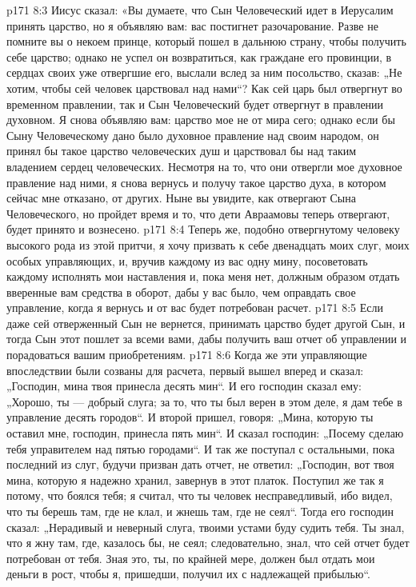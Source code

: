 \vs p171 8:3 \pc Иисус сказал: «Вы думаете, что Сын Человеческий идет в Иерусалим принять царство, но я объявляю вам: вас постигнет разочарование. Разве не помните вы о некоем принце, который пошел в дальнюю страну, чтобы получить себе царство; однако не успел он возвратиться, как граждане его провинции, в сердцах своих уже отвергшие его, выслали вслед за ним посольство, сказав: „Не хотим, чтобы сей человек царствовал над нами“? Как сей царь был отвергнут во временном правлении, так и Сын Человеческий будет отвергнут в правлении духовном. Я снова объявляю вам: царство мое не от мира сего; однако если бы Сыну Человеческому дано было духовное правление над своим народом, он принял бы такое царство человеческих душ и царствовал бы над таким владением сердец человеческих. Несмотря на то, что они отвергли мое духовное правление над ними, я снова вернусь и получу такое царство духа, в котором сейчас мне отказано, от других. Ныне вы увидите, как отвергают Сына Человеческого, но пройдет время и то, что дети Авраамовы теперь отвергают, будет принято и вознесено.
\vs p171 8:4 Теперь же, подобно отвергнутому человеку высокого рода из этой притчи, я хочу призвать к себе двенадцать моих слуг, моих особых управляющих, и, вручив каждому из вас одну мину, посоветовать каждому исполнять мои наставления и, пока меня нет, должным образом отдать вверенные вам средства в оборот, дабы у вас было, чем оправдать свое управление, когда я вернусь и от вас будет потребован расчет.
\vs p171 8:5 Если даже сей отверженный Сын не вернется, принимать царство будет другой Сын, и тогда Сын этот пошлет за всеми вами, дабы получить ваш отчет об управлении и порадоваться вашим приобретениям.
\vs p171 8:6 Когда же эти управляющие впоследствии были созваны для расчета, первый вышел вперед и сказал: „Господин, мина твоя принесла десять мин“. И его господин сказал ему: „Хорошо, ты --- добрый слуга; за то, что ты был верен в этом деле, я дам тебе в управление десять городов“. И второй пришел, говоря: „Мина, которую ты оставил мне, господин, принесла пять мин“. И сказал господин: „Посему сделаю тебя управителем над пятью городами“. И так же поступал с остальными, пока последний из слуг, будучи призван дать отчет, не ответил: „Господин, вот твоя мина, которую я надежно хранил, завернув в этот платок. Поступил же так я потому, что боялся тебя; я считал, что ты человек несправедливый, ибо видел, что ты берешь там, где не клал, и жнешь там, где не сеял“. Тогда его господин сказал: „Нерадивый и неверный слуга, твоими устами буду судить тебя. Ты знал, что я жну там, где, казалось бы, не сеял; следовательно, знал, что сей отчет будет потребован от тебя. Зная это, ты, по крайней мере, должен был отдать мои деньги в рост, чтобы я, пришедши, получил их с надлежащей прибылью“.
